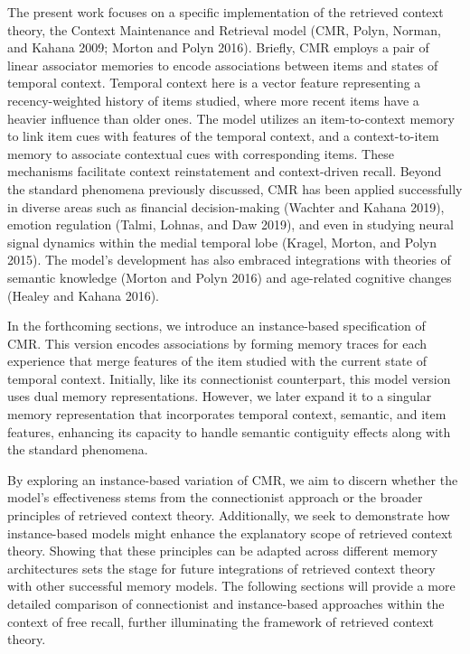 \documentclass[
  letterpaper,
  11pt,
  english,
  singlespacing,
  headsepline]{MastersDoctoralThesis}
\begin{document}
The present work focuses on a specific implementation of the retrieved
context theory, the Context Maintenance and Retrieval model (CMR, Polyn,
Norman, and Kahana 2009; Morton and Polyn 2016). Briefly, CMR employs a
pair of linear associator memories to encode associations between items
and states of temporal context. Temporal context here is a vector
feature representing a recency-weighted history of items studied, where
more recent items have a heavier influence than older ones. The model
utilizes an item-to-context memory to link item cues with features of
the temporal context, and a context-to-item memory to associate
contextual cues with corresponding items. These mechanisms facilitate
context reinstatement and context-driven recall. Beyond the standard
phenomena previously discussed, CMR has been applied successfully in
diverse areas such as financial decision-making (Wachter and Kahana
2019), emotion regulation (Talmi, Lohnas, and Daw 2019), and even in
studying neural signal dynamics within the medial temporal lobe (Kragel,
Morton, and Polyn 2015). The model's development has also embraced
integrations with theories of semantic knowledge (Morton and Polyn 2016)
and age-related cognitive changes (Healey and Kahana 2016).

In the forthcoming sections, we introduce an instance-based
specification of CMR. This version encodes associations by forming
memory traces for each experience that merge features of the item
studied with the current state of temporal context. Initially, like its
connectionist counterpart, this model version uses dual memory
representations. However, we later expand it to a singular memory
representation that incorporates temporal context, semantic, and item
features, enhancing its capacity to handle semantic contiguity effects
along with the standard phenomena.

By exploring an instance-based variation of CMR, we aim to discern
whether the model's effectiveness stems from the connectionist approach
or the broader principles of retrieved context theory. Additionally, we
seek to demonstrate how instance-based models might enhance the
explanatory scope of retrieved context theory. Showing that these
principles can be adapted across different memory architectures sets the
stage for future integrations of retrieved context theory with other
successful memory models. The following sections will provide a more
detailed comparison of connectionist and instance-based approaches
within the context of free recall, further illuminating the framework of
retrieved context theory.
\end{document}
